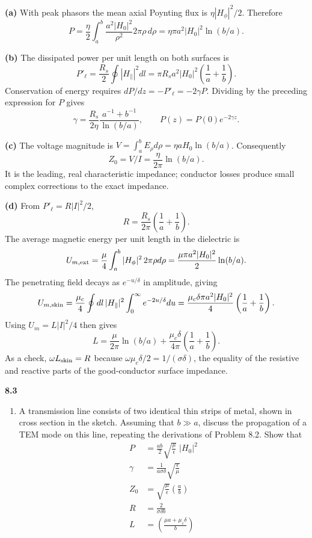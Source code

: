 \textbf{(a)} With peak phasors the mean axial Poynting flux is
$\eta|H_\phi|^2/2$.  Therefore
\[
P=\frac\eta2\int_a^b\frac{a^2|H_0|^2}{\rho^2}2\pi\rho\,d\rho
=\boxed{\eta\pi a^2|H_0|^2\ln(b/a)}.
\]

\textbf{(b)} The dissipated power per unit length on both surfaces is
\[
P'_\ell=\frac{R_s}2\oint|H_\parallel|^2dl
=\pi R_sa^2|H_0|^2\left(\frac1a+\frac1b\right).
\]
Conservation of energy requires $dP/dz=-P'_\ell=-2\gamma P$.
Dividing by the preceding expression for $P$ gives
\[
\gamma=\frac{R_s}{2\eta}\frac{a^{-1}+b^{-1}}{\ln(b/a)},
\qquad P(z)=P(0)e^{-2\gamma z}.
\]

\textbf{(c)} The voltage magnitude is
$V=\int_a^bE_\rho d\rho=\eta aH_0\ln(b/a)$.  Consequently
\[
\boxed{Z_0=V/I=\frac\eta{2\pi}\ln(b/a).}
\]
It is the leading, real characteristic impedance; conductor losses
produce small complex corrections to the exact impedance.

\textbf{(d)} From $P'_\ell=R|I|^2/2$,
\[
\boxed{R=\frac{R_s}{2\pi}\left(\frac1a+\frac1b\right).}
\]
The average magnetic energy per unit length in the dielectric is
\[
U_{m,\rm ext}=\frac\mu4\int_a^b|H_\phi|^2\,2\pi\rho d\rho
=\frac{\mu\pi a^2|H_0|^2}{2}\ln(b/a).
\]
The penetrating field decays as $e^{-u/\delta}$ in amplitude, giving
\[
U_{m,\rm skin}=\frac{\mu_c}{4}\oint dl\,|H_\parallel|^2
\int_0^\infty e^{-2u/\delta}du
=\frac{\mu_c\delta\pi a^2|H_0|^2}{4}
\left(\frac1a+\frac1b\right).
\]
Using $U_m=L|I|^2/4$ then gives
\[
\boxed{L=\frac\mu{2\pi}\ln(b/a)+
\frac{\mu_c\delta}{4\pi}\left(\frac1a+\frac1b\right).}
\]
As a check, $\omega L_{\rm skin}=R$ because
$\omega\mu_c\delta/2=1/(\sigma\delta)$, the equality of the
resistive and reactive parts of the good-conductor surface impedance.

\par\bigskip
\noindent\textbf{8.3}\quad\begin{enumerate}
\item[(a)] A transmission line consists of two identical thin strips of metal, shown in cross section in the sketch. Assuming that $b\gg a$, discuss the propagation of a TEM mode on this line, repeating the derivations of Problem 8.2. Show that
\begin{align*}
P&=\frac{ab}{2}\sqrt{\frac{\mu}{\epsilon}}\;|H_{0}|^{2}\\[2pt]
\gamma&=\frac{1}{a\sigma\delta}\sqrt{\frac{\epsilon}{\mu}}\\[2pt]
Z_{0}&=\sqrt{\frac{\mu}{\epsilon}}\left(\frac{a}{b}\right)\\[2pt]
R&=\frac{2}{\sigma\delta b}\\[2pt]
L&=\left(\frac{\mu a+\mu_{c}\delta}{b}\right)
\end{align*}
\end{enumerate}


